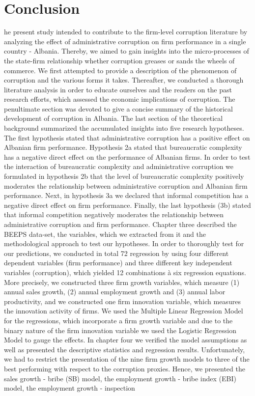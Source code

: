 %
%
\let\textcircled=\pgftextcircled
\chapter{Conclusion}
\label{chap:results}

he present study intended to contribute to the firm-level corruption literature by analyzing the effect of administrative corruption on firm performance in a single country - Albania. Thereby, we aimed to gain insights into the micro-processes of the state-firm relationship whether corruption greases or sands the wheels of commerce. We first attempted to provide a description of the phenomenon of corruption and the various forms it takes. Thereafter, we conducted a thorough literature analysis in order to educate ourselves and the readers on the past research efforts, which assessed the economic implications of corruption. The penultimate section was devoted to give a concise summary of the historical development of corruption in Albania. The last section of the theoretical background summarized the accumulated insights into five research hypotheses. The first hypothesis stated that administrative corruption has a positive effect on Albanian firm performance. Hypothesis 2a stated that bureaucratic complexity has a negative direct effect on the performance of Albanian firms. In order to test the interaction of bureaucratic complexity and administrative corruption we formulated in hypothesis 2b that the level of bureaucratic complexity positively moderates the relationship between administrative corruption and Albanian firm performance. Next, in hypothesis 3a we declared that informal competition has a negative direct effect on firm performance. Finally, the last hypothesis (3b) stated that informal competition negatively moderates the relationship between administrative corruption and firm performance. Chapter three described the BEEPS data-set, the variables, which we extracted from it and the methodological approach to test our hypotheses. In order to thoroughly test for our predictions, we conducted in total 72 regression by using four different dependent variables (firm performance) and three different key independent variables (corruption), which yielded 12 combinations \`{a} six regression equations. More precisely, we constructed three firm growth variables, which measure (1) annual sales growth, (2) annual employment growth and (3) annual labor productivity, and we constructed one firm innovation variable, which measures the innovation activity of firms. We used the Multiple Linear Regression Model for the regressions, which incorporate a firm growth variable and due to the binary nature of the firm innovation variable we used the Logistic Regression Model to gauge the effects. In chapter four we verified the model assumptions as well as presented the descriptive statistics and regression results. Unfortunately, we had to restrict the presentation of the nine firm growth models to three of the best performing with respect to the corruption proxies. Hence, we presented the sales growth - bribe (SB) model, the employment growth - bribe index (EBI) model, the employment growth - inspection 
